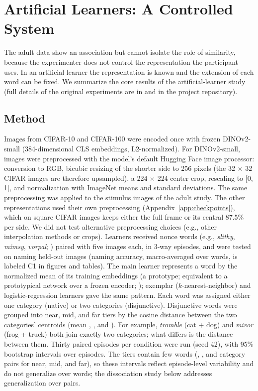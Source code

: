 \documentclass[11pt]{article}
\begin{document}
\section{Artificial Learners: A Controlled System}
\label{sec:learners}


The adult data show an association but cannot isolate the role of similarity, because the experimenter does not control the representation the participant uses. In an artificial learner the representation is known and the extension of each word can be fixed. We summarize the core results of the artificial-learner study (full details of the original experiments are in \textcite{vera2026lexical} and in the project repository).

\subsection{Method}

Images from CIFAR-10 and CIFAR-100 \parencite{krizhevsky2009} were encoded once with frozen DINOv2-small \parencite{oquab2023} (384-dimensional CLS embeddings, L2-normalized). For DINOv2-small, images were preprocessed with the model's default Hugging Face image processor: conversion to RGB, bicubic resizing of the shorter side to 256 pixels (the 32 $\times$ 32 CIFAR images are therefore upsampled), a 224 $\times$ 224 center crop, rescaling to [0, 1], and normalization with ImageNet means and standard deviations. The same preprocessing was applied to the stimulus images of the adult study. The other representations used their own preprocessing (Appendix~\ref{app:checkpoints}), which on square CIFAR images keeps either the full frame or its central 87.5\% per side. We did not test alternative preprocessing choices (e.g., other interpolation methods or crops). Learners received nonce words (e.g., \emph{slithy}, \emph{mimsy}, \emph{vorpal}; \cite{carroll1871}) paired with five images each, in 3-way episodes, and were tested on naming held-out images (naming accuracy, macro-averaged over words, is labeled C1 in figures and tables). The main learner represents a word by the normalized mean of its training embeddings (a prototype; equivalent to a prototypical network over a frozen encoder; \cite{snell2017}); exemplar ($k$-nearest-neighbor) and logistic-regression learners gave the same pattern. Each word was assigned either one category (native) or two categories (disjunctive). Disjunctive words were grouped into near, mid, and far tiers by the cosine distance between the two categories' centroids (mean \DmemNear, \DmemMid, and \DmemFar). For example, \emph{tromble} (cat + dog) and \emph{mivor} (frog + truck) both join exactly two categories; what differs is the distance between them. Thirty paired episodes per condition were run (seed 42), with 95\% bootstrap intervals over episodes. The tiers contain few words (\NPairsNear, \NPairsMid, and \NPairsFar{} category pairs for near, mid, and far), so these intervals reflect episode-level variability and do not generalize over words; the dissociation study below addresses generalization over pairs.
\end{document}
